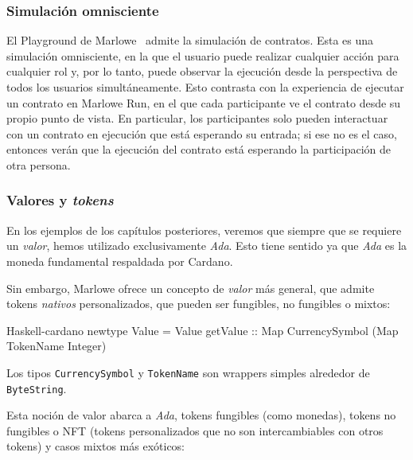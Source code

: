 \documentclass[12pt]{book}
\begin{document}
\subsubsection{Simulación omnisciente}
El Playground de Marlowe~\cite{marlowe_playground} admite la simulación de contratos. Esta es una simulación omnisciente, en la que el usuario puede realizar cualquier acción para cualquier rol y, por lo tanto, puede observar la ejecución desde la perspectiva de todos los usuarios simultáneamente. Esto contrasta con la experiencia de ejecutar un contrato en Marlowe Run, en el que cada participante ve el contrato desde su propio punto de vista. En particular, los participantes solo pueden interactuar con un contrato en ejecución que está esperando su entrada; si ese no es el caso, entonces verán que la ejecución del contrato está esperando la participación de otra persona.

\subsubsection{Valores y \textit{tokens}}
En los ejemplos de los capítulos posteriores, veremos que siempre que se requiere un \textit{valor}, hemos utilizado exclusivamente \textit{Ada}. Esto tiene sentido ya que \textit{Ada} es la moneda fundamental respaldada por Cardano.

Sin embargo, Marlowe ofrece un concepto de \textit{valor} más general, que admite tokens \textit{nativos} personalizados, que pueden ser fungibles, no fungibles o mixtos:

\begin{code}[title=Definicion del tipo \texttt{Value}]{Haskell-cardano}
newtype Value = Value
    {getValue :: Map CurrencySymbol (Map TokenName Integer)}
\end{code}

Los tipos \texttt{CurrencySymbol} y \texttt{TokenName} son wrappers simples alrededor de \texttt{ByteString}.


Esta noción de valor abarca a \textit{Ada}, tokens fungibles (como monedas), tokens no fungibles o NFT (tokens personalizados que no son intercambiables con otros tokens) y casos mixtos más exóticos:
\end{document}
